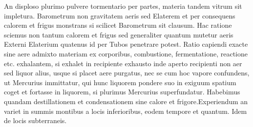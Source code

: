  \pstart[71 v\textsuperscript{o}] An disploso plurimo pulvere tormentario per partes, materia tandem vitrum sit impletura.
 \pend 
 \pstart Barometrum\protect{} non gravitatem aeris\protect{} sed Elaterem\protect{} et per consequens calorem et frigus monstrans si scilicet Barometrum\protect{} sit clausum. Hac ratione sciemus non tantum calorem et frigus sed generaliter quantum mutetur aeris Externi Elaterium\protect{} quatenus  id per Tubos penetrare potest.
 \pend 
 \pstart Ratio capiendi exacte sine aere admixto materiam ex corporibus, combustione, fermentatione, reactione etc. exhalantem, si exhalet in recipiente exhausto inde aperto recipienti non aer sed liquor alius, usque si placet aere purgatus, nec se cum hoc vapore confundens, ut Mercurius\protect{} immittatur, qui hunc liquorem pondere suo in exiguum spatium coget et fortasse in liquorem, si plurimus Mercurius\protect{} superfundatur. Habebimus quandam destillationem et condensationem sine calore et frigore.\pend \pstart Experiendum an  variet in summis montibus a locis inferioribus, eodem tempore et quantum. Idem de locis subterraneis.
 \pend 
 \clearpage